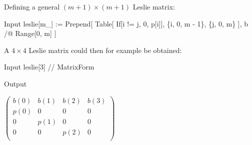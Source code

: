 \documentclass[11pt,fleqn]{book} %
\begin{document}
\begin{theorem}
\hfill \break
Defining a general $(m+1) \times (m+1)$ Leslie matrix:
\begin{mmaCell}[index=1]{Input}
   leslie[m_] := 
    Prepend[
      Table[
        If[i != j, 0, p[i]],
        \{i, 0, m - 1\}, \{j, 0, m\}
      ],
      b /@ Range[0, m]
    ]
\end{mmaCell}
A $4 \times 4$ Leslie matrix could then for example be obtained:
\begin{mmaCell}{Input}
  leslie[3] // MatrixForm
\end{mmaCell}
\begin{mmaCell}[form=MatrixForm]{Output}

\end{mmaCell}
   $ \begin{pmatrix}
  b(0) & b(1) & b(2) & b(3) \\
  p(0) & 0 & 0 & 0 \\
  0 & p(1) & 0 & 0 \\
  0 & 0 & p(2) & 0 \\
  \end{pmatrix} $
  

\end{theorem}
\end{document}
